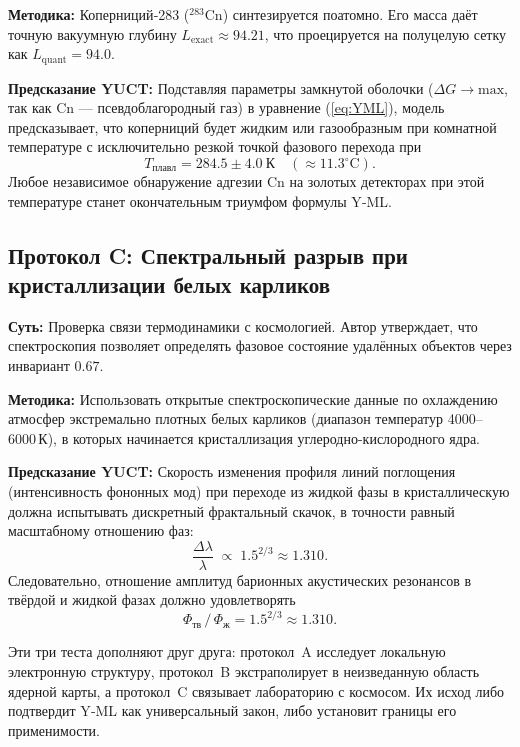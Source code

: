 \documentclass[12pt,a4paper]{article}
\theoremstyle{remark}
\begin{document}
	\textbf{Методика:} Коперниций‑283 (\(^{283}\mathrm{Cn}\)) синтезируется поатомно. Его масса даёт точную вакуумную глубину \(L_{\mathrm{exact}} \approx 94.21\), что проецируется на полуцелую сетку как \(L_{\mathrm{quant}} = 94.0\).
	
	\textbf{Предсказание YUCT:} Подставляя параметры замкнутой оболочки (\(\Delta G \to \mathrm{max}\), так как Cn — псевдоблагородный газ) в уравнение (\ref{eq:YML}), модель предсказывает, что коперниций будет жидким или газообразным при комнатной температуре с исключительно резкой точкой фазового перехода при
	\begin{equation}
		T_{\text{плавл}} = 284.5 \pm 4.0~\mathrm{К} \quad (\approx 11.3^\circ\mathrm{C}).
	\end{equation}
	Любое независимое обнаружение адгезии Cn на золотых детекторах при этой температуре станет окончательным триумфом формулы Y‑ML.
	
	\subsection{Протокол C: Спектральный разрыв при кристаллизации белых карликов}
	\textbf{Суть:} Проверка связи термодинамики с космологией. Автор утверждает, что спектроскопия позволяет определять фазовое состояние удалённых объектов через инвариант \(0.67\).
	
	\textbf{Методика:} Использовать открытые спектроскопические данные по охлаждению атмосфер экстремально плотных белых карликов (диапазон температур 4000–6000 К), в которых начинается кристаллизация углеродно-кислородного ядра.
	
	\textbf{Предсказание YUCT:} Скорость изменения профиля линий поглощения (интенсивность фононных мод) при переходе из жидкой фазы в кристаллическую должна испытывать дискретный фрактальный скачок, в точности равный масштабному отношению фаз:
	\begin{equation}
		\frac{\Delta \lambda}{\lambda} \;\propto\; 1.5^{2/3} \approx 1.310 .
	\end{equation}
	Следовательно, отношение амплитуд барионных акустических резонансов в твёрдой и жидкой фазах должно удовлетворять
	\begin{equation}
		\Phi_{\text{тв}} \,/\, \Phi_{\text{ж}} = 1.5^{2/3} \approx 1.310 .
	\end{equation}
	
	Эти три теста дополняют друг друга: протокол~A исследует локальную электронную структуру, протокол~B экстраполирует в неизведанную область ядерной карты, а протокол~C связывает лабораторию с космосом. Их исход либо подтвердит Y‑ML как универсальный закон, либо установит границы его применимости.
	
\end{document}
